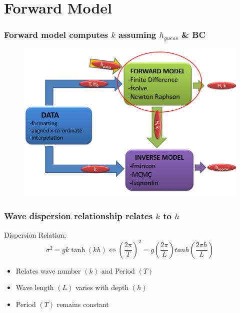 \documentclass[7pt]{beamer}
\begin{document}
\section{Forward Model}

\begin{frame}
 	\frametitle{Forward model computes $k$ assuming $h_{guess}$ \& BC}
		\begin{figure}[H]
	 		\centering
	 		\includegraphics[width=1.0\linewidth]{img/Flow_New.png}
	 	\end{figure}
\end{frame}

\begin{frame}
	\frametitle{Wave dispersion relationship relates $k$ to $h$}
		Dispersion Relation:
		$$ \sigma^2=gk\tanh(kh) \Longleftrightarrow \left(\frac{2\pi}{T}\right)^2 = g\left(\frac{2\pi}{L}\right) tanh \left(\frac{2\pi h}{L}\right)
		$$
		\begin{itemize}
			\item Relates wave number $(k)$ and Period $(T)$
			\item Wave length $(L)$ varies with depth $(h)$
			\item Period $(T)$ remains constant
		\end{itemize}
\end{frame}
\end{document}
